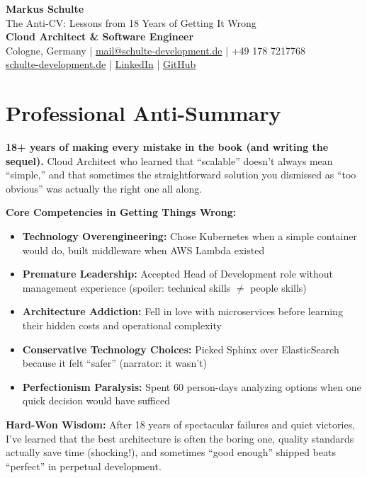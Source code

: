 \documentclass[11pt,a4paper]{article}
\begin{document}
\begin{center}
{\huge\bfseries Markus Schulte}\\[4pt]
{\large The Anti-CV: Lessons from 18 Years of Getting It Wrong}\\[8pt]
\textbf{Cloud Architect \& Software Engineer}\\
Cologne, Germany | \href{mailto:mail@schulte-development.de}{mail@schulte-development.de} | +49 178 7217768\\
\href{https://schulte-development.de}{schulte-development.de} | \href{https://linkedin.com/in/markus-schulte}{LinkedIn} | \href{https://github.com/SchulteDev}{GitHub}
\end{center}

\vspace{8pt}

\section{Professional Anti-Summary}

\textbf{18+ years of making every mistake in the book (and writing the sequel).} Cloud Architect who learned that ``scalable'' doesn't always mean ``simple,'' and that sometimes the straightforward solution you dismissed as ``too obvious'' was actually the right one all along.

\textbf{Core Competencies in Getting Things Wrong:}
\begin{itemize}[leftmargin=15pt, topsep=0pt, itemsep=1pt]
\item \textbf{Technology Overengineering:} Chose Kubernetes when a simple container would do, built middleware when AWS Lambda existed
\item \textbf{Premature Leadership:} Accepted Head of Development role without management experience (spoiler: technical skills $\neq$ people skills)
\item \textbf{Architecture Addiction:} Fell in love with microservices before learning their hidden costs and operational complexity
\item \textbf{Conservative Technology Choices:} Picked Sphinx over ElasticSearch because it felt ``safer'' (narrator: it wasn't)
\item \textbf{Perfectionism Paralysis:} Spent 60 person-days analyzing options when one quick decision would have sufficed
\end{itemize}

\textbf{Hard-Won Wisdom:} After 18 years of spectacular failures and quiet victories, I've learned that the best architecture is often the boring one, quality standards actually save time (shocking!), and sometimes ``good enough'' shipped beats ``perfect'' in perpetual development.
\end{document}
